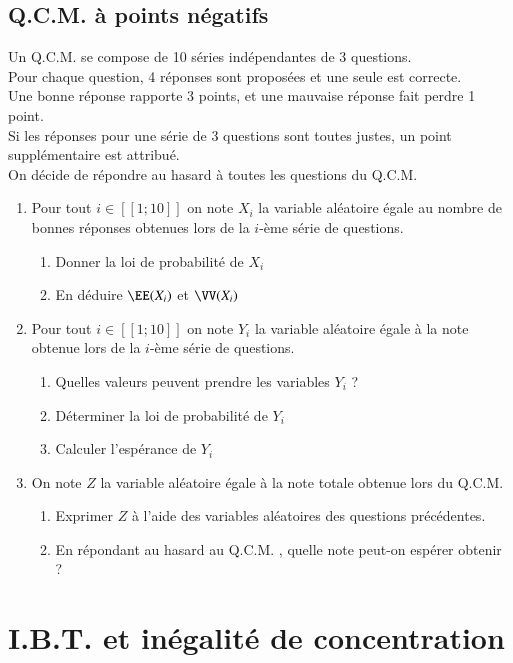 \documentclass[oneside,12pt]{article}          %
\begin{document}
\subsection{Q.C.M. à points négatifs}
Un Q.C.M. se compose de 10 séries indépendantes de 3 questions.\\
Pour chaque question, 4 réponses sont proposées et une seule est correcte.\\
Une bonne réponse rapporte 3 points, et une mauvaise réponse fait perdre 1 point.\\
Si les réponses pour une série de 3 questions sont toutes justes, un point supplémentaire est attribué.\\
On décide de répondre au hasard à toutes les questions du Q.C.M.
\begin{enumerate}
    \item Pour tout $i\in[\![1;10]\!]$ on note $X_i$ la variable aléatoire égale au nombre de bonnes réponses obtenues lors de la $i$-ème série de questions.
    \begin{enumerate}
        \item Donner la loi de probabilité de $X_i$
        \item En déduire $\EE(X_i)$ et $\VV(X_i)$
    \end{enumerate}
    \item Pour tout $i\in[\![1;10]\!]$ on note $Y_i$ la variable aléatoire égale à la note obtenue lors de la $i$-ème série de questions.
    \begin{enumerate}
        \item Quelles valeurs peuvent prendre les variables $Y_i$ ?
        \item Déterminer la loi de probabilité de $Y_i$
        \item Calculer l'espérance de $Y_i$
    \end{enumerate}
    \item On note $Z$ la variable aléatoire égale à la note totale obtenue lors du Q.C.M.
    \begin{enumerate}
        \item Exprimer $Z$ à l'aide des variables aléatoires des questions précédentes.
        \item En répondant au hasard au Q.C.M. , quelle note peut-on espérer obtenir ?
    \end{enumerate}
\end{enumerate}



\section{I.B.T. et inégalité de concentration}
\end{document}
